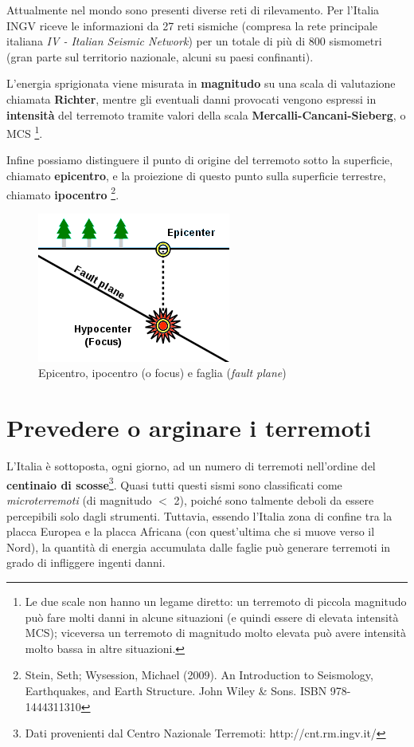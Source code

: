 \documentclass[a4paper,10pt]{memoir}
\begin{document}
Attualmente nel mondo sono presenti diverse reti di rilevamento. Per l'Italia INGV riceve le informazioni da 27 reti sismiche (compresa la rete principale italiana \textit{IV - Italian Seismic Network}) per un totale di più di 800 sismometri (gran parte sul territorio nazionale, alcuni su paesi confinanti).

L'energia sprigionata viene misurata in \textbf{magnitudo} su una scala di valutazione chiamata \textbf{Richter}, mentre gli eventuali danni provocati vengono espressi in \textbf{intensità} del terremoto tramite valori della scala \textbf{Mercalli-Cancani-Sieberg}, o MCS \footnote{Le due scale non hanno un legame diretto: un terremoto di piccola magnitudo può fare molti danni in alcune situazioni (e quindi essere di elevata intensità MCS); viceversa un terremoto di magnitudo molto elevata può avere intensità molto bassa in altre situazioni.}.

Infine possiamo distinguere il punto di origine del terremoto sotto la superficie, chiamato \textbf{epicentro}, e la proiezione di questo punto sulla superficie terrestre, chiamato \textbf{ipocentro} \footnote{Stein, Seth; Wysession, Michael (2009). An Introduction to Seismology, Earthquakes, and Earth Structure. John Wiley \& Sons. ISBN 978-1444311310}.

\begin{figure}[ht]
\caption{Epicentro, ipocentro (o focus) e faglia (\textit{fault plane})}
\label{fig:epiipo}
\centering
\includegraphics[scale=0.6]{introduzione/epicenter_diagram}
\end{figure}


\section{Prevedere o arginare i terremoti}

L'Italia è sottoposta, ogni giorno, ad un numero di terremoti nell'ordine del \textbf{centinaio di scosse}\footnote{Dati provenienti dal Centro Nazionale Terremoti: http://cnt.rm.ingv.it/}. Quasi tutti questi sismi sono classificati come \textit{microterremoti} (di magnitudo $<$ 2), poiché sono talmente deboli da essere percepibili solo dagli strumenti. Tuttavia, essendo l'Italia zona di confine tra la placca Europea e la placca Africana (con quest'ultima che si muove verso il Nord), la quantità di energia accumulata dalle faglie può generare terremoti in grado di infliggere ingenti danni.
\end{document}
